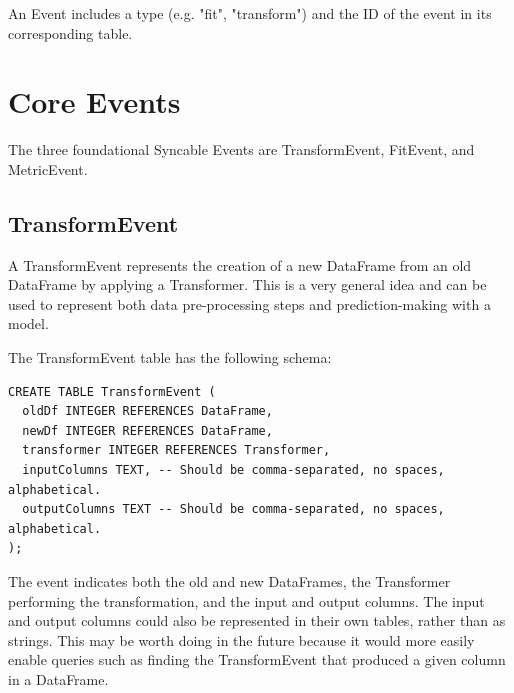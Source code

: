 An Event includes a type (e.g. "fit", "transform") and the ID of the event
in its corresponding table.

\section{Core Events}
The three foundational Syncable Events are TransformEvent, FitEvent, and MetricEvent.

\subsection{TransformEvent}
A TransformEvent represents the creation of a new DataFrame from an old DataFrame by
applying a Transformer. This is a very general idea and can be used to represent both
data pre-processing steps and prediction-making with a model.

The TransformEvent table has the following schema:

\begin{verbatim}
CREATE TABLE TransformEvent (
  oldDf INTEGER REFERENCES DataFrame,
  newDf INTEGER REFERENCES DataFrame,
  transformer INTEGER REFERENCES Transformer,
  inputColumns TEXT, -- Should be comma-separated, no spaces, alphabetical.
  outputColumns TEXT -- Should be comma-separated, no spaces, alphabetical.
);
\end{verbatim}

The event indicates both the old and new DataFrames, the Transformer performing
the transformation, and the input and output columns. The input and output columns
could also be represented in their own tables, rather than as strings. This may
be worth doing in the future because it would more easily enable queries such as
finding the TransformEvent that produced a given column in a DataFrame.

